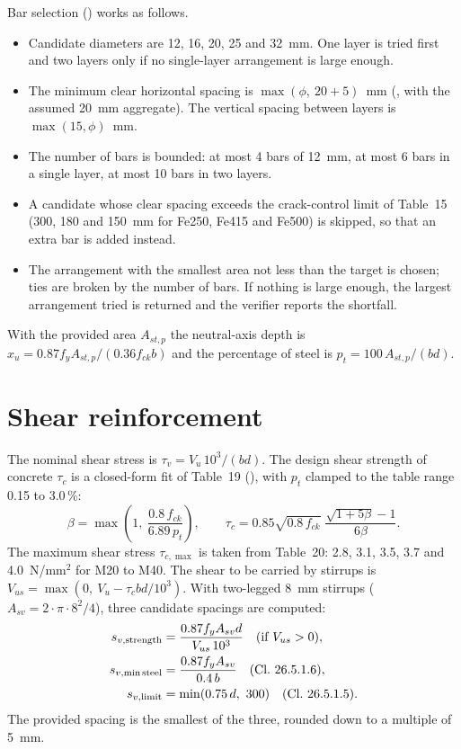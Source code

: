 Bar selection () works as follows.
\begin{itemize}
  \item Candidate diameters are 12, 16, 20, 25 and 32~mm. One layer is tried first and two layers only if no single-layer arrangement is large enough.
  \item The minimum clear horizontal spacing is $\max(\phi,\ 20 + 5)$~mm (, with the assumed 20~mm aggregate). The vertical spacing between layers is $\max(15,\phi)$~mm.
  \item The number of bars is bounded: at most 4 bars of 12~mm, at most 6 bars in a single layer, at most 10 bars in two layers.
  \item A candidate whose clear spacing exceeds the crack-control limit of Table~15 (300, 180 and 150~mm for Fe250, Fe415 and Fe500) is skipped, so that an extra bar is added instead.
  \item The arrangement with the smallest area not less than the target is chosen; ties are broken by the number of bars. If nothing is large enough, the largest arrangement tried is returned and the verifier reports the shortfall.
\end{itemize}
With the provided area $A_{st,p}$ the neutral-axis depth is $x_u = 0.87 f_y A_{st,p}/(0.36 f_{ck} b)$ and the percentage of steel is $p_t = 100\,A_{st,p}/(b d)$.

\section{Shear reinforcement}
The nominal shear stress is $\tau_v = V_u\,10^{3}/(b d)$. The design shear strength of concrete $\tau_c$ is a closed-form fit of Table~19 (), with $p_t$ clamped to the table range 0.15 to 3.0\,\%:
\begin{equation}
  \beta = \max\!\left(1,\ \frac{0.8\,f_{ck}}{6.89\,p_t}\right), \qquad
  \tau_c = 0.85\sqrt{0.8\,f_{ck}}\;\frac{\sqrt{1+5\beta}-1}{6\beta}.
\end{equation}
The maximum shear stress $\tau_{c,\max}$ is taken from Table~20: 2.8, 3.1, 3.5, 3.7 and 4.0~N/mm$^2$ for M20 to M40. The shear to be carried by stirrups is $V_{us} = \max(0,\ V_u - \tau_c b d/10^{3})$. With two-legged 8~mm stirrups ($A_{sv} = 2\cdot\pi\cdot 8^2/4$), three candidate spacings are computed:
\begin{align}
  s_{v,\mathrm{strength}} &= \frac{0.87 f_y A_{sv} d}{V_{us}\,10^{3}} \quad(\text{if } V_{us}>0), \\
  s_{v,\mathrm{min\,steel}} &= \frac{0.87 f_y A_{sv}}{0.4\,b} \quad(\text{Cl.~26.5.1.6}),\\
  s_{v,\mathrm{limit}} &= \min(0.75\,d,\ 300) \quad(\text{Cl.~26.5.1.5}).
\end{align}
The provided spacing is the smallest of the three, rounded down to a multiple of 5~mm.

